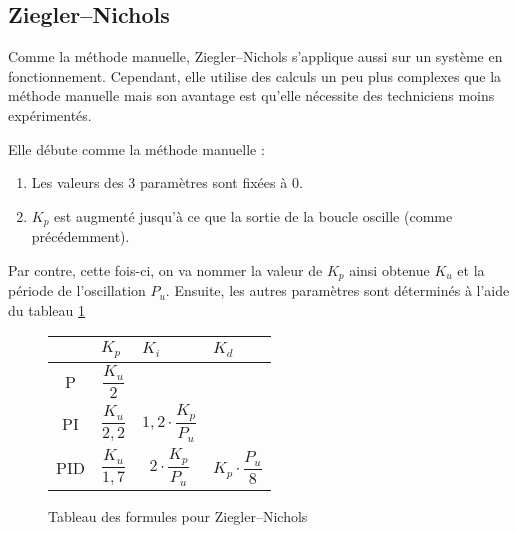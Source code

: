 \documentclass[a4paper,10pt]{report}
\begin{document}
\subsection{Ziegler–Nichols}
Comme la méthode manuelle, Ziegler–Nichols s'applique aussi sur un système en fonctionnement. Cependant, elle utilise des calculs un peu plus complexes que la méthode manuelle mais son avantage est qu'elle nécessite des techniciens moins expérimentés.\cite{ziegler1942optimum}\cite{silva2007pid}

Elle débute comme la méthode manuelle :
\begin{enumerate}
    \item Les valeurs des 3 paramètres sont fixées à $0$.
    \item $K_p$ est augmenté jusqu'à ce que la sortie de la boucle oscille (comme précédemment).
\end{enumerate}

Par contre, cette fois-ci, on va nommer la valeur de $K_p$ ainsi obtenue $K_u$ et la période de l'oscillation $P_u$.
Ensuite, les autres paramètres sont déterminés à l'aide du tableau \ref{tab:ZieglerNicholsTuningFormulas}

\def\tabularxcolumn#1{m{#1}}
\begin{figure}[ht]
    \begin{center}
        \begin{tabularx}{\textwidth}{| c | X | X | X |}
            \hline
            & $K_p$ & $K_i$ & $K_d$\\ \hline
            P & \begin{equation*}\frac{K_u}{2}\end{equation*} & &\\ \hline
            PI & \begin{equation*}\frac{K_u}{2,2}\end{equation*} & \begin{equation*}1,2 \cdot \frac{K_p}{P_u}\end{equation*} &\\ \hline
            PID & \begin{equation*}\frac{K_u}{1,7}\end{equation*} & \begin{equation*}2 \cdot \frac{K_p}{P_u}\end{equation*} & \begin{equation*}K_p \cdot \frac{P_u}{8}\end{equation*} \\
            \hline
        \end{tabularx}
    \end{center}
    \caption{Tableau des formules pour Ziegler–Nichols}
    \label{tab:ZieglerNicholsTuningFormulas}
\end{figure}
\end{document}
